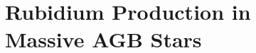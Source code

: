 \chapter[Rubidium Production in Massive AGB Stars]{\textbf{Rubidium Production in \\ Massive AGB Stars}}
\label{ch:Rb}

